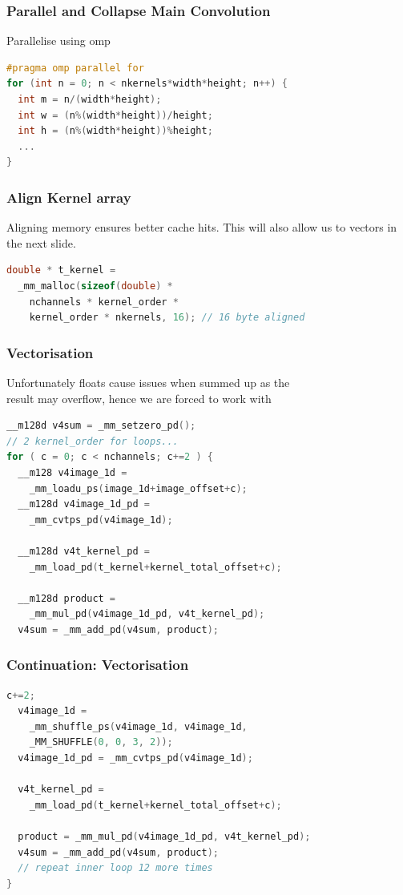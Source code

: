 \documentclass{beamer}
\begin{document}
\begin{frame}[fragile]
\frametitle{Parallel and Collapse Main Convolution}
Parallelise using omp
\begin{lstlisting}[language=C,keywordstyle=\color{blue}]
#pragma omp parallel for
for (int n = 0; n < nkernels*width*height; n++) {
  int m = n/(width*height);
  int w = (n%(width*height))/height;
  int h = (n%(width*height))%height;
  ...
}
\end{lstlisting}
\end{frame}

\begin{frame}[fragile]
\frametitle{Align Kernel array}
Aligning memory ensures better cache hits. This will also
allow us to vectors in the next slide.
\begin{lstlisting}[language=C,keywordstyle=\color{blue}]
double * t_kernel = 
  _mm_malloc(sizeof(double) * 
    nchannels * kernel_order * 
    kernel_order * nkernels, 16); // 16 byte aligned
\end{lstlisting}
\end{frame}

\begin{frame}[fragile]
\frametitle{Vectorisation}
Unfortunately floats cause issues when summed up as the \\
result may overflow, hence we are forced to work with \\
\begin{lstlisting}[language=C,keywordstyle=\color{blue}]
__m128d v4sum = _mm_setzero_pd();
// 2 kernel_order for loops...
for ( c = 0; c < nchannels; c+=2 ) {
  __m128 v4image_1d = 
    _mm_loadu_ps(image_1d+image_offset+c);
  __m128d v4image_1d_pd = 
    _mm_cvtps_pd(v4image_1d);

  __m128d v4t_kernel_pd = 
    _mm_load_pd(t_kernel+kernel_total_offset+c);

  __m128d product = 
    _mm_mul_pd(v4image_1d_pd, v4t_kernel_pd);
  v4sum = _mm_add_pd(v4sum, product);

\end{lstlisting}
\end{frame}

\begin{frame}[fragile]
\frametitle{Continuation: Vectorisation}
\begin{lstlisting}[language=C,keywordstyle=\color{blue}]
  c+=2;
  v4image_1d = 
    _mm_shuffle_ps(v4image_1d, v4image_1d, 
    _MM_SHUFFLE(0, 0, 3, 2));
  v4image_1d_pd = _mm_cvtps_pd(v4image_1d);

  v4t_kernel_pd = 
    _mm_load_pd(t_kernel+kernel_total_offset+c);

  product = _mm_mul_pd(v4image_1d_pd, v4t_kernel_pd);
  v4sum = _mm_add_pd(v4sum, product);
  // repeat inner loop 12 more times 
}
\end{lstlisting}
\end{frame}
\end{document}
